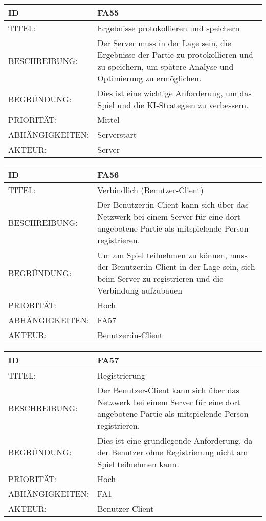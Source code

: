 \documentclass{uulm-assignment}
\begin{document}
    \begin{tabularx}{\textwidth}{|l|X |} \hline
        \textbf{ID} & \textbf{FA55} \\
        \hline
        TITEL: & Ergebnisse protokollieren und speichern\\
        \hline
        BESCHREIBUNG: & Der Server muss in der Lage sein, die Ergebnisse der Partie zu protokollieren und zu speichern, um spätere Analyse und Optimierung zu ermöglichen. 
        \\
        \hline
        BEGRÜNDUNG: &  Dies ist eine wichtige Anforderung, um das Spiel und die KI-Strategien zu verbessern.\\
        \hline
        PRIORITÄT: & Mittel \\
        \hline
        ABHÄNGIGKEITEN: &  Serverstart\\
        \hline
        AKTEUR: & Server \\
        \hline
    \end{tabularx}
    
    \begin{tabularx}{\textwidth}{|l|X |} \hline
        \textbf{ID} & \textbf{FA56} \\
        \hline
        TITEL: & Verbindlich (Benutzer-Client)\\
        \hline
        BESCHREIBUNG: & Der Benutzer:in-Client kann sich über das Netzwerk bei einem Server für eine dort angebotene Partie als mitspielende Person registrieren.
        \\
        \hline
        BEGRÜNDUNG: &  Um am Spiel teilnehmen zu können, muss der Benutzer:in-Client in der Lage sein, sich beim Server zu registrieren und die Verbindung aufzubauen \\
        \hline
        PRIORITÄT: & Hoch\\
        \hline
        ABHÄNGIGKEITEN: & FA57 \\
        \hline
        AKTEUR: & Benutzer:in-Client\\
        \hline
    \end{tabularx}
    
    \begin{tabularx}{\textwidth}{|l|X |} \hline
        \textbf{ID} & \textbf{FA57} \\
        \hline
        TITEL: & Registrierung\\
        \hline
        BESCHREIBUNG: & Der Benutzer-Client kann sich über das Netzwerk bei einem Server für eine dort angebotene Partie als mitspielende Person registrieren. 
        \\
        \hline
        BEGRÜNDUNG: & Dies ist eine grundlegende Anforderung, da der Benutzer ohne Registrierung nicht am Spiel teilnehmen kann. 
        \\
        \hline
        PRIORITÄT: & Hoch\\
        \hline
        ABHÄNGIGKEITEN: &   FA1\\
        \hline
        AKTEUR: & Benutzer-Client\\
        \hline
    \end{tabularx}
    
\end{document}
